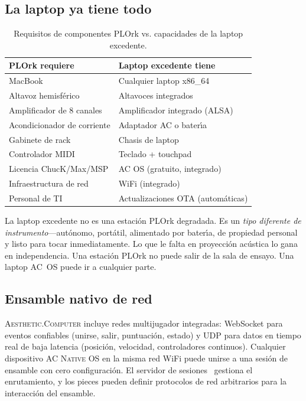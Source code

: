 \documentclass[10pt,letterpaper,twocolumn]{article}
\newcommand{\ac}{\textsc{Aesthetic.Computer}}
\newcommand{\acos}{\textsc{AC Native OS}}
\begin{document}
\subsection{La laptop ya tiene todo}

\begin{table}[h]
\small
\centering
\begin{tabular}{ll}
\toprule
\textbf{PLOrk requiere} & \textbf{Laptop excedente tiene} \\
\midrule
MacBook & Cualquier laptop x86\_64 \\
Altavoz hemisf\'{e}rico & Altavoces integrados \\
Amplificador de 8 canales & Amplificador integrado (ALSA) \\
Acondicionador de corriente & Adaptador AC o bater\'{\i}a \\
Gabinete de rack & Chasis de laptop \\
Controlador MIDI & Teclado + touchpad \\
Licencia ChucK/Max/MSP & AC OS (gratuito, integrado) \\
Infraestructura de red & WiFi (integrado) \\
Personal de TI & Actualizaciones OTA (autom\'{a}ticas) \\
\bottomrule
\end{tabular}
\caption{Requisitos de componentes PLOrk vs. capacidades de la laptop excedente.}
\label{tab:plork-vs-surplus}
\end{table}

La laptop excedente no es una estaci\'{o}n PLOrk degradada. Es un \emph{tipo diferente de instrumento}---aut\'{o}nomo, port\'{a}til, alimentado por bater\'{\i}a, de propiedad personal y listo para tocar inmediatamente. Lo que le falta en proyecci\'{o}n ac\'{u}stica lo gana en independencia. Una estaci\'{o}n PLOrk no puede salir de la sala de ensayo. Una laptop AC~OS puede ir a cualquier parte.

\subsection{Ensamble nativo de red}

\ac{} incluye redes multijugador integradas: WebSocket para eventos confiables (unirse, salir, puntuaci\'{o}n, estado) y UDP para datos en tiempo real de baja latencia (posici\'{o}n, velocidad, controladores continuos). Cualquier dispositivo \acos{} en la misma red WiFi puede unirse a una sesi\'{o}n de ensamble con cero configuraci\'{o}n. El servidor de sesiones~\citep{scudder2026ac} gestiona el enrutamiento, y los pieces pueden definir protocolos de red arbitrarios para la interacci\'{o}n del ensamble.
\end{document}

